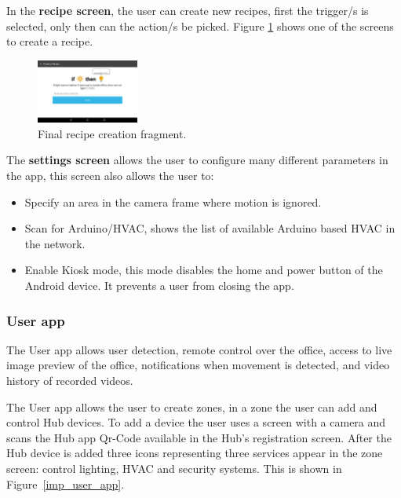 \documentclass[conference]{IEEEtran}
\begin{document}
In the \textbf{recipe screen}, the user can create new recipes, first the trigger/s is selected, only then can the action/s be picked. Figure \ref{screen_completed_recipe} shows one of the screens to create a recipe. 

\begin{figure}[h]
\centering
\includegraphics[width=0.3\textwidth]{Figures/screen_completed_recipe}
\caption{Final recipe creation fragment.}
\label{screen_completed_recipe}
\end{figure}

The \textbf{settings screen} allows the user to configure many different parameters in the app, this screen also allows the user to:
\begin{itemize}
 
  \item Specify an area in the camera frame where motion is ignored.
  
  \item Scan for Arduino/HVAC, shows the list of available Arduino based HVAC in the network.
  
  \item Enable Kiosk mode, this mode disables the home and power button of the Android device. It prevents a user from closing the app. 
    
  
\end{itemize}







\subsubsection{User app}


The User app allows user detection, remote control over the office, access to live image preview of the office, notifications when movement is detected, and video history of recorded videos.

The User app allows the user to create zones, in a zone the user can add and control Hub devices. To add a device the user uses a screen with a camera and scans the Hub app Qr-Code available in the Hub's registration screen.
After the Hub device is added three icons representing three services appear in the zone screen: control lighting, \ac{HVAC} and security systems. This is shown in Figure~\ref{imp_user_app}.
\end{document}
